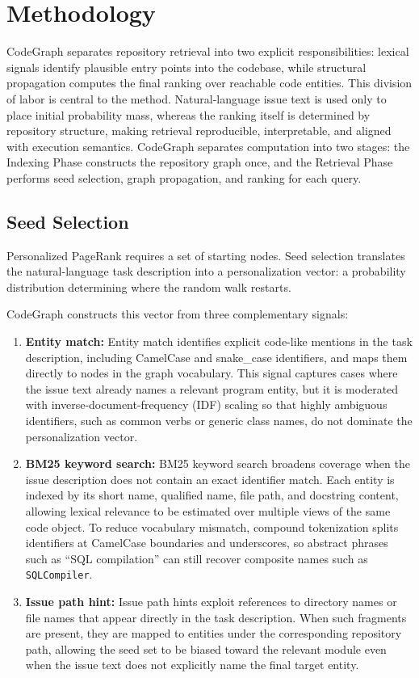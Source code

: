 \section{Methodology}
\label{sec:method}

CodeGraph separates repository retrieval into two explicit responsibilities: lexical signals identify plausible entry points into the codebase, while structural propagation computes the final ranking over reachable code entities. This division of labor is central to the method. Natural-language issue text is used only to place initial probability mass, whereas the ranking itself is determined by repository structure, making retrieval reproducible, interpretable, and aligned with execution semantics. CodeGraph separates computation into two stages: the Indexing Phase constructs the repository graph once, and the Retrieval Phase performs seed selection, graph propagation, and ranking for each query.

\subsection{Seed Selection}

Personalized PageRank requires a set of starting nodes. Seed selection translates the natural-language task description into a personalization vector: a probability distribution determining where the random walk restarts.

CodeGraph constructs this vector from three complementary signals:
\begin{enumerate}
    \item \textbf{Entity match:} Entity match identifies explicit code-like mentions in the task description, including CamelCase and snake\_case identifiers, and maps them directly to nodes in the graph vocabulary. This signal captures cases where the issue text already names a relevant program entity, but it is moderated with inverse-document-frequency (IDF) scaling so that highly ambiguous identifiers, such as common verbs or generic class names, do not dominate the personalization vector.
    \item \textbf{BM25 keyword search:} BM25 keyword search broadens coverage when the issue description does not contain an exact identifier match. Each entity is indexed by its short name, qualified name, file path, and docstring content, allowing lexical relevance to be estimated over multiple views of the same code object. To reduce vocabulary mismatch, compound tokenization splits identifiers at CamelCase boundaries and underscores, so abstract phrases such as ``SQL compilation'' can still recover composite names such as \texttt{SQLCompiler}.
    \item \textbf{Issue path hint:} Issue path hints exploit references to directory names or file names that appear directly in the task description. When such fragments are present, they are mapped to entities under the corresponding repository path, allowing the seed set to be biased toward the relevant module even when the issue text does not explicitly name the final target entity.
\end{enumerate}

